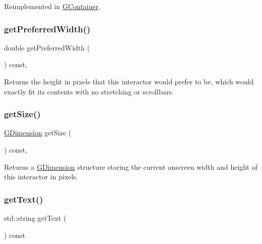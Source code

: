 Reimplemented in \mbox{\hyperlink{classGContainer_ac0fd6fc35681f935c67ad68078b354b8}{G\+Container}}.

\mbox{\label{classGInteractor_a82bca31d37700fb0e35d2743352efd5e}} 
\subsubsection{\texorpdfstring{get\+Preferred\+Width()}{getPreferredWidth()}}
{\footnotesize\ttfamily double get\+Preferred\+Width (\begin{DoxyParamCaption}{ }\end{DoxyParamCaption}) const\hspace{0.3cm}{\ttfamily [virtual]}, {\ttfamily [inherited]}}



Returns the height in pixels that this interactor would prefer to be, which would exactly fit its contents with no stretching or scrollbars. 

\mbox{\label{classGInteractor_a7b4eec96a2bdc6420695d5796a78eea9}} 
\subsubsection{\texorpdfstring{get\+Size()}{getSize()}}
{\footnotesize\ttfamily \mbox{\hyperlink{structGDimension}{G\+Dimension}} get\+Size (\begin{DoxyParamCaption}{ }\end{DoxyParamCaption}) const\hspace{0.3cm}{\ttfamily [virtual]}, {\ttfamily [inherited]}}



Returns a \mbox{\hyperlink{structGDimension}{G\+Dimension}} structure storing the current onscreen width and height of this interactor in pixels. 

\mbox{\label{classGTextField_aff553c50924b836c29f146ed34a7c6ec}} 
\subsubsection{\texorpdfstring{get\+Text()}{getText()}}
{\footnotesize\ttfamily std\+::string get\+Text (\begin{DoxyParamCaption}{ }\end{DoxyParamCaption}) const\hspace{0.3cm}{\ttfamily [virtual]}}



